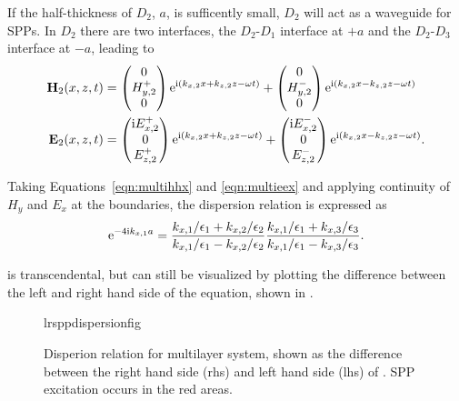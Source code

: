 If the half-thickness of $D_2$, $a$, is sufficently small, $D_2$ will act
as a waveguide for SPPs.  In $D_2$ there are two interfaces, the
$D_2$-$D_1$ interface at $+a$ and the $D_2$-$D_3$ interface at $-a$,
leading to
\begin{align}
\mathbf{H}_2(x,z,t) &=
\begin{pmatrix}
0\\
H^+_{y,2}\\
0
\end{pmatrix} {\mathrm{e}}^{{\mathrm{i}}(k_{x,2}x+k_{z,2}z-\omega t)}
+
\begin{pmatrix}
0\\
H^-_{y,2}\\
0
\end{pmatrix} {\mathrm{e}}^{{\mathrm{i}}(k_{x,2}x-k_{z,2}z-\omega t)} \\
\label{eqn:multihhx}
\mathbf{E}_2(x,z,t) &=
\begin{pmatrix}
{\mathrm{i}} E^+_{x,2}\\
0\\
E^+_{z,2}\\
\end{pmatrix} {\mathrm{e}}^{{\mathrm{i}}(k_{x,2}x+k_{z,2}z-\omega t)}
+
\begin{pmatrix}
{\mathrm{i}} E^-_{x,2}\\
0\\
E^-_{z,2}\\
\end{pmatrix} {\mathrm{e}}^{{\mathrm{i}}(k_{x,2}x-k_{z,2}z-\omega t)}.
\label{eqn:multieex}
\end{align}

Taking Equations~\ref{eqn:multihhx} and \ref{eqn:multieex} and applying
continuity of $H_y$ and $E_x$ at the boundaries, the dispersion relation is
expressed as
\begin{equation}
{\mathrm{e}}^{-4 {\mathrm{i}} k_{x,1} a} = 
\frac{k_{x,1}/\epsilon_1 + k_{x,2}/\epsilon_2}
     {k_{x,1}/\epsilon_1 - k_{x,2}/\epsilon_2}
\frac{k_{x,1}/\epsilon_1 + k_{x,3}/\epsilon_3}
     {k_{x,1}/\epsilon_1 - k_{x,3}/\epsilon_3}.
\label{eqn:lrsppdispersion}
\end{equation}

 is transcendental, but can still be
visualized by plotting the difference between the left and right hand side
of the equation, shown in .

\begin{figure}[ht]
 \centering
{lrsppdispersionfig}
\label{fig:lrsppdispersionrelation}
\caption{Disperion relation for multilayer system, shown as the difference
 between the right hand side (rhs) and left hand side (lhs) of
.  SPP excitation occurs in the red areas.}
\end{figure}

